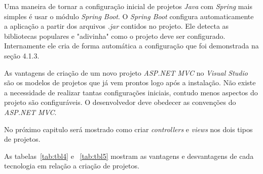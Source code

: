 Uma maneira de tornar a configuração inicial de projetos \textit{Java} com \textit{Spring} mais simples é usar o módulo \textit{Spring Boot}. O \textit{Spring Boot} configura automaticamente a aplicação a partir dos arquivos \textit{.jar} contidos no projeto. Ele detecta as bibliotecas populares e "adivinha" como o projeto deve ser configurado. Internamente ele cria de forma automática a configuração que foi demonstrada na seção 4.1.3.

As vantagens de criação de um novo projeto \textit{ASP.NET MVC} no \textit{Visual Studio} são os modelos de projetos que já vem prontos logo após a instalação. Não existe a necessidade de realizar tantas configurações iniciais, contudo menos aspectos do projeto são configuráveis. O desenvolvedor deve obedecer as convenções do \textit{ASP.NET MVC}.

No próximo capitulo será mostrado como criar \textit{controllers} e \textit{views} nos dois tipos de projetos.

As tabelas~\ref{tab:tbl4} e ~\ref{tab:tbl5} mostram as vantagens e desvantagens de cada tecnologia em relação a criação de projetos.

\begin{table}[h!]   
    \centering
\end{table}

\begin{table}[h!]   
    \centering
\end{table}
